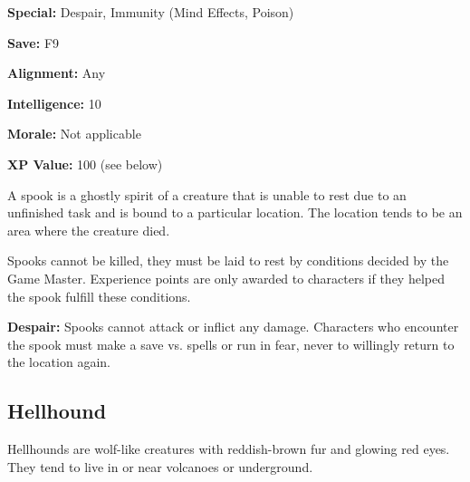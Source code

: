 \begin{multicols*}{2}
{\textbf{Special:} Despair, Immunity (Mind Effects, Poison)

\textbf{Save:} F9

\textbf{Alignment:} Any

\textbf{Intelligence:} 10

\textbf{Morale:} Not applicable

\textbf{XP Value:} 100 (see below)}

A spook is a ghostly spirit of a creature that is unable to rest due to an unfinished task and is bound to a particular location. The location tends to be an area where the creature died.

Spooks cannot be killed, they must be laid to rest by conditions decided by the Game Master. Experience points are only awarded to characters if they helped the spook fulfill these conditions.

\textbf{Despair:} Spooks cannot attack or inflict any damage. Characters who encounter the spook must make a save vs. spells or run in fear, never to willingly return to the location again.

\subsection{Hellhound}

Hellhounds are wolf-like creatures with reddish-brown fur and glowing red eyes. They tend to live in or near volcanoes or underground.


\end{multicols*}
